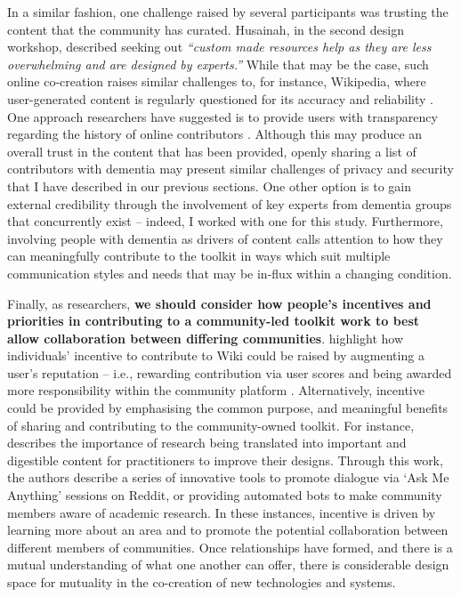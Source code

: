 In a similar fashion, one challenge raised by several participants was trusting the content that the community has curated. Husainah, in the second design workshop, described seeking out \textit{``custom made resources help as they are less overwhelming and are designed by experts.''} While that may be the case, such online co-creation raises similar challenges to, for instance, Wikipedia, where user-generated content is regularly questioned for its accuracy and reliability  \citep{kittur2008can}. One approach researchers have suggested is to provide users with transparency regarding the history of online contributors \citep{heuer2018trust}. Although this may produce an overall trust in the content that has been provided, openly sharing a list of contributors with dementia may present similar challenges of privacy and security that I have described in our previous sections. One other option is to gain external credibility through the involvement of key experts from dementia groups that concurrently exist – indeed, I worked with one for this study. Furthermore, involving people with dementia as drivers of content calls attention to how they can meaningfully contribute to the toolkit in ways which suit multiple communication styles and needs that may be in-flux within a changing condition.

Finally, as researchers, \textbf{we should consider how people’s incentives and priorities in contributing to a community-led toolkit work to best allow collaboration between differing communities}. \cite{borges2008towards} highlight how individuals’ incentive to contribute to Wiki could be raised by augmenting a user’s reputation – i.e., rewarding contribution via user scores and being awarded more responsibility within the community platform . Alternatively, incentive could be provided by emphasising the common purpose, and meaningful benefits of sharing and contributing to the community-owned toolkit. For instance, \cite{colusso2017translational} describes the importance of research being translated into important and digestible content for practitioners to improve their designs. Through this work, the authors describe a series of innovative tools to promote dialogue via ‘Ask Me Anything’ sessions on Reddit, or providing automated bots to make community members aware of academic research.  In these instances, incentive is driven by learning more about an area and to promote the potential collaboration between different members of communities. Once relationships have formed, and there is a mutual understanding of what one another can offer, there is considerable design space for mutuality in the co-creation of new technologies and systems.

